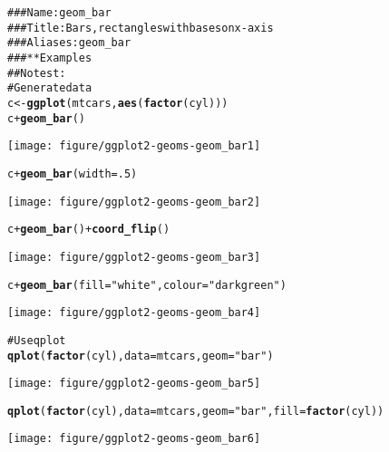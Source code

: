 \documentclass[a4paper,titlepage]{tufte-handout}\usepackage{graphicx, color}
\makeatletter
\def\maxwidth{ %
  \ifdim\Gin@nat@width>\linewidth
    \linewidth
  \else
    \Gin@nat@width
  \fi
}
\newcommand{\hlfunctioncall}[1]{\textcolor[rgb]{0.501960784313725,0,0.329411764705882}{\textbf{#1}}}%
\newcommand{\hlstring}[1]{\textcolor[rgb]{0.6,0.6,1}{#1}}%
\newcommand{\hlcomment}[1]{\textcolor[rgb]{0.180392156862745,0.6,0.341176470588235}{#1}}%
\newenvironment{kframe}{%
 \def\at@end@of@kframe{}%
 \ifinner\ifhmode%
  \def\at@end@of@kframe{\end{minipage}}%
  \begin{minipage}{\columnwidth}%
 \fi\fi%
 \def\FrameCommand##1{\hskip\@totalleftmargin \hskip-\fboxsep
 \colorbox{shadecolor}{##1}\hskip-\fboxsep
     \hskip-\linewidth \hskip-\@totalleftmargin \hskip\columnwidth}%
 \MakeFramed {\advance\hsize-\width
   \@totalleftmargin\z@ \linewidth\hsize
   \@setminipage}}%
 {\par\unskip\endMakeFramed%
 \at@end@of@kframe}
\newenvironment{knitrout}{}{} %
\makeatother
\begin{document}
\begin{knitrout}
\color{fgcolor}\begin{kframe}
\begin{alltt}
\hlcomment{### Name: geom_bar}
\hlcomment{### Title: Bars, rectangles with bases on x-axis}
\hlcomment{### Aliases: geom_bar}
\hlcomment{### ** Examples}
\hlcomment{## No test: }
\hlcomment{# Generate data}
c <- \hlfunctioncall{ggplot}(mtcars, \hlfunctioncall{aes}(\hlfunctioncall{factor}(cyl)))
c + \hlfunctioncall{geom_bar}()
\end{alltt}
\end{kframe}\texttt{[image: figure/ggplot2-geoms-geom\_bar1]} \begin{kframe}\begin{alltt}
c + \hlfunctioncall{geom_bar}(width=.5)
\end{alltt}
\end{kframe}\texttt{[image: figure/ggplot2-geoms-geom\_bar2]} \begin{kframe}\begin{alltt}
c + \hlfunctioncall{geom_bar}() + \hlfunctioncall{coord_flip}()
\end{alltt}
\end{kframe}\texttt{[image: figure/ggplot2-geoms-geom\_bar3]} \begin{kframe}\begin{alltt}
c + \hlfunctioncall{geom_bar}(fill=\hlstring{"white"}, colour=\hlstring{"darkgreen"})
\end{alltt}
\end{kframe}\texttt{[image: figure/ggplot2-geoms-geom\_bar4]} \begin{kframe}\begin{alltt}
\hlcomment{# Use qplot}
\hlfunctioncall{qplot}(\hlfunctioncall{factor}(cyl), data=mtcars, geom=\hlstring{"bar"})
\end{alltt}
\end{kframe}\texttt{[image: figure/ggplot2-geoms-geom\_bar5]} \begin{kframe}\begin{alltt}
\hlfunctioncall{qplot}(\hlfunctioncall{factor}(cyl), data=mtcars, geom=\hlstring{"bar"}, fill=\hlfunctioncall{factor}(cyl))
\end{alltt}
\end{kframe}\texttt{[image: figure/ggplot2-geoms-geom\_bar6]} \begin{kframe}\begin{alltt}

\end{alltt}
\end{kframe}
\end{knitrout}
\end{document}
